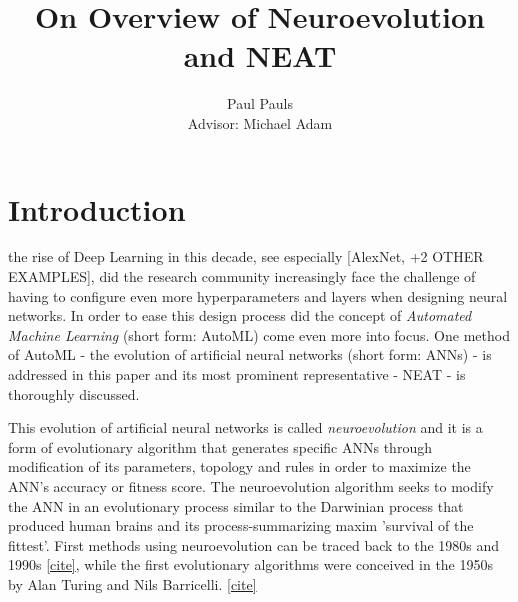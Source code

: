 \documentclass[journal, a4paper]{IEEEtran}
\begin{document}
\title{On Overview of Neuroevolution and NEAT}
\author{Paul Pauls\\
        Advisor: Michael Adam}
\maketitle


\tableofcontents

\begin{abstract}
    \blindtext
\end{abstract}



\section{Introduction}

 the rise of Deep Learning in this decade, see especially [AlexNet, +2 OTHER EXAMPLES], did the research community increasingly face the challenge of having to configure even more hyperparameters and layers when designing neural networks. In order to ease this design process did the concept of \textit{Automated Machine Learning} (short form: AutoML) come even more into focus. One method of AutoML - the evolution of artificial neural networks (short form: ANNs) - is addressed in this paper and its most prominent representative - NEAT - is thoroughly discussed. 

This evolution of artificial neural networks is called \textit{neuroevolution} and it is a form of evolutionary algorithm that generates specific ANNs through modification of its parameters, topology and rules in order to maximize the ANN's accuracy or fitness score. The neuroevolution algorithm seeks to modify the ANN in an evolutionary process similar to the Darwinian process that produced human brains and its process-summarizing maxim 'survival of the fittest'. First methods using neuroevolution can be traced back to the 1980s and 1990s \href{https://www.inovex.de/blog/neuroevolution/}{[cite]}, while the first evolutionary algorithms were conceived in the 1950s by Alan Turing and Nils Barricelli. \href{https://en.wikipedia.org/wiki/Genetic_algorithm#cite_note-mind.oxfordjournals.org-33}{[cite]}
\end{document}
